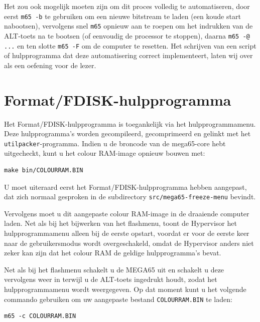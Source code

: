 Het zou ook mogelijk moeten zijn om dit proces volledig te automatiseren, door eerst {\tt m65 -b} te gebruiken om een nieuwe bitstream te laden (een koude start nabootsen), vervolgens snel {\tt m65} opnieuw aan te roepen om het indrukken van de ALT-toets na te bootsen (of eenvoudig de processor te stoppen), daarna {\tt m65 -@ ...} en ten slotte {\tt m65 -F} om de computer te resetten. Het schrijven van een script of hulpprogramma dat deze automatisering correct implementeert, laten wij over als een oefening voor de lezer.

\section{Format/FDISK-hulpprogramma}

Het Format/FDISK-hulpprogramma is toegankelijk via het hulpprogrammamenu. Deze hulpprogramma's worden gecompileerd, gecomprimeerd en gelinkt met het {\tt utilpacker}-programma. Indien u de broncode van de mega65-core hebt uitgecheckt, kunt u het colour RAM-image opnieuw bouwen met:

\begin{tcolorbox}[colback=black,coltext=white]
\verbatimfont{\codefont}
\begin{verbatim}
make bin/COLOURRAM.BIN
\end{verbatim}
\end{tcolorbox}

U moet uiteraard eerst het Format/FDISK-hulpprogramma hebben aangepast, dat zich normaal gesproken in de subdirectory {\tt src/mega65-freeze-menu} bevindt.

Vervolgens moet u dit aangepaste colour RAM-image in de draaiende computer laden. Net als bij het bijwerken van het flashmenu, toont de Hypervisor het hulpprogrammamenu alleen bij de eerste opstart, voordat er voor de eerste keer naar de gebruikersmodus wordt overgeschakeld, omdat de Hypervisor anders niet zeker kan zijn dat het colour RAM de geldige hulpprogramma's bevat.

Net als bij het flashmenu schakelt u de MEGA65 uit en schakelt u deze vervolgens weer in terwijl u de ALT-toets ingedrukt houdt, zodat het hulpprogrammamenu wordt weergegeven. Op dat moment kunt u het volgende commando gebruiken om uw aangepaste bestand {\tt COLOURRAM.BIN} te laden:

\begin{tcolorbox}[colback=black,coltext=white]
\verbatimfont{\codefont}
\begin{verbatim}
m65 -c COLOURRAM.BIN
\end{verbatim}
\end{tcolorbox}

